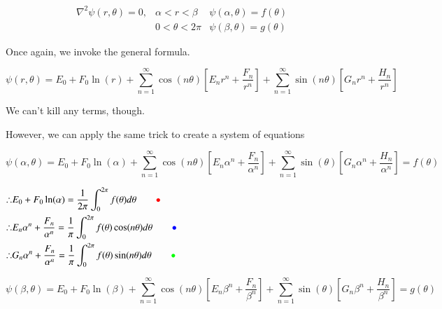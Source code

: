 \documentclass{report}
\begin{document}
\begin{center}

\end{center}

$$
\begin{array}{rll}
\nabla^{2} \psi(r, \theta)=0, & \alpha<r<\beta & \psi(\alpha, \theta)=f(\theta) \\
& 0<\theta<2 \pi & \psi(\beta, \theta)=g(\theta)
\end{array}
$$

Once again, we invoke the general formula.

$$
\psi(r, \theta)=E_{0}+F_{0} \ln (r)+\sum\limits_{n=1}^{\infty} \cos (n \theta)\left[E_{n} r^{n}+\dfrac{F_{n}}{r^{n}}\right]+\sum\limits_{n=1}^{\infty} \sin (n \theta)\left[G_{n} r^{n}+\dfrac{H_{n}}{r^{n}}\right]
$$

We can't kill any terms, though.

However, we can apply the same trick to create a system of equations

$$\psi(\alpha, \theta)=E_{0}+F_{0} \ln (\alpha)+\sum\limits_{n=1}^{\infty} \cos (n \theta)\left[E_{n} \alpha^{n}+\dfrac{F_{n}}{\alpha^{n}}\right]+\sum\limits_{n=1}^{\infty} \sin (\theta)\left[G_{n} \alpha^{n}+\dfrac{H_{n}}{\alpha^{n}}\right]=f(\theta)$$

$
\begin{aligned}
\therefore & E_{0}+F_{0} \ln (\alpha)=\dfrac{1}{2 \pi} \displaystyle\int_{0}^{2 \pi} f(\theta) d \theta \qquad\textcolor{red}{\bullet}\\
\therefore & E_{n} \alpha^{n}+\dfrac{F_{n}}{\alpha^{n}}=\dfrac{1}{\pi} \displaystyle\int_{0}^{2 \pi} f(\theta) \cos (n \theta) d \theta \qquad\textcolor{blue}{\bullet}\\
\therefore & G_{n} \alpha^{n}+\dfrac{F_{n}}{\alpha^{n}}=\dfrac{1}{\pi} \displaystyle\int_{0}^{2 \pi} f(\theta) \sin (n \theta) d \theta\qquad\textcolor{green}{\bullet}
\end{aligned}$

$$\psi(\beta, \theta)=E_{0}+F_{0} \ln (\beta)+\sum\limits_{n=1}^{\infty} \cos (n \theta)\left[E_{n} \beta^{n}+\dfrac{F_{n}}{\beta^{n}}\right]+\sum\limits_{n=1}^{\infty} \sin (\theta)\left[G_{n} \beta^{n}+\dfrac{H_{n}}{\beta^{n}}\right]=g(\theta)$$ 
\end{document}
